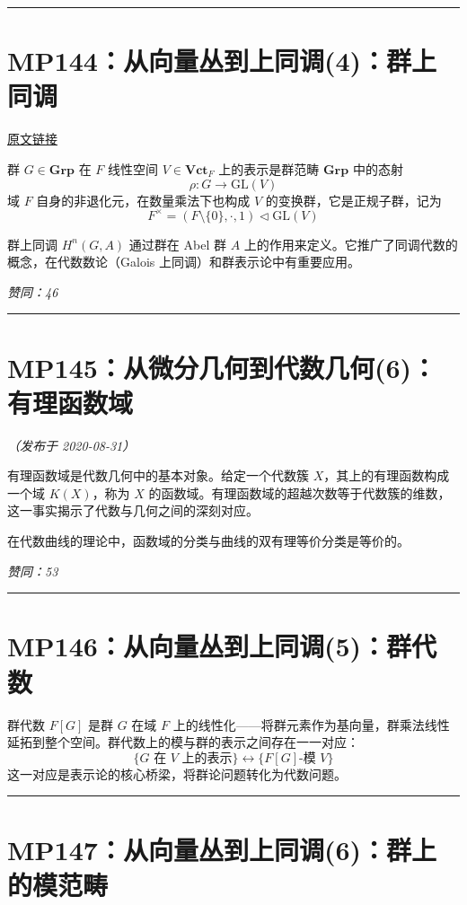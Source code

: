 \documentclass[10pt, openany]{book}
\begin{document}
\medskip
\noindent\rule{\textwidth}{0.4pt}

\section{MP144：从向量丛到上同调(4)：群上同调}
\label{sec:mp144}

\href{https://zhuanlan.zhihu.com/p/47934082}{原文链接}

群 $G \in \textbf{Grp}$ 在 $F$ 线性空间 $V \in \textbf{Vct}_F$ 上的表示是群范畴 $\textbf{Grp}$ 中的态射
\[
\rho: G \to \text{GL}(V)
\]
域 $F$ 自身的非退化元，在数量乘法下也构成 $V$ 的变换群，它是正规子群，记为
\[
F^\times = (F \setminus \{0\}, \cdot, 1) \lhd \text{GL}(V)
\]

群上同调 $H^n(G, A)$ 通过群在 Abel 群 $A$ 上的作用来定义。它推广了同调代数的概念，在代数数论（Galois 上同调）和群表示论中有重要应用。

\textit{赞同：46}

\medskip
\noindent\rule{\textwidth}{0.4pt}

\section{MP145：从微分几何到代数几何(6)：有理函数域}
\label{sec:mp145}

\textit{（发布于 2020-08-31）}

有理函数域是代数几何中的基本对象。给定一个代数簇 $X$，其上的有理函数构成一个域 $K(X)$，称为 $X$ 的函数域。有理函数域的超越次数等于代数簇的维数，这一事实揭示了代数与几何之间的深刻对应。

在代数曲线的理论中，函数域的分类与曲线的双有理等价分类是等价的。

\textit{赞同：53}

\medskip
\noindent\rule{\textwidth}{0.4pt}

\section{MP146：从向量丛到上同调(5)：群代数}
\label{sec:mp146}

群代数 $F[G]$ 是群 $G$ 在域 $F$ 上的线性化——将群元素作为基向量，群乘法线性延拓到整个空间。群代数上的模与群的表示之间存在一一对应：
\[
\{\text{$G$ 在 $V$ 上的表示}\} \longleftrightarrow \{F[G]\text{-模 $V$}\}
\]
这一对应是表示论的核心桥梁，将群论问题转化为代数问题。

\medskip
\noindent\rule{\textwidth}{0.4pt}

\section{MP147：从向量丛到上同调(6)：群上的模范畴}
\label{sec:mp147}
\end{document}
